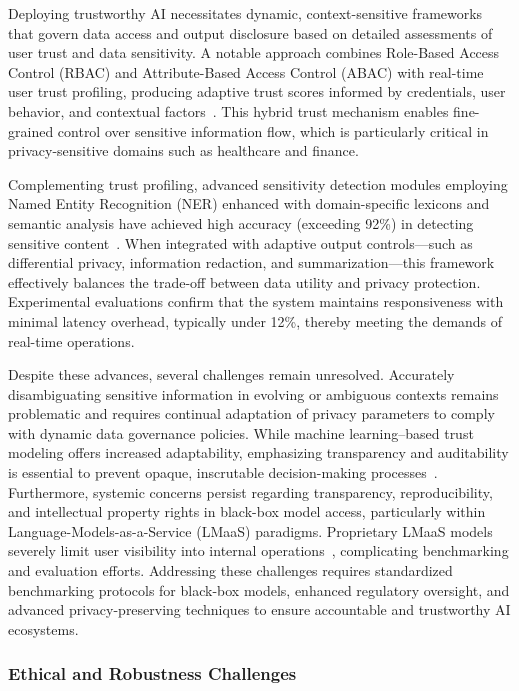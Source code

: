 \documentclass[sigconf]{acmart}
\begin{document}
Deploying trustworthy AI necessitates dynamic, context-sensitive frameworks that govern data access and output disclosure based on detailed assessments of user trust and data sensitivity. A notable approach combines Role-Based Access Control (RBAC) and Attribute-Based Access Control (ABAC) with real-time user trust profiling, producing adaptive trust scores informed by credentials, user behavior, and contextual factors~\cite{ref11}. This hybrid trust mechanism enables fine-grained control over sensitive information flow, which is particularly critical in privacy-sensitive domains such as healthcare and finance.

Complementing trust profiling, advanced sensitivity detection modules employing Named Entity Recognition (NER) enhanced with domain-specific lexicons and semantic analysis have achieved high accuracy (exceeding 92\%) in detecting sensitive content~\cite{ref11}. When integrated with adaptive output controls—such as differential privacy, information redaction, and summarization—this framework effectively balances the trade-off between data utility and privacy protection. Experimental evaluations confirm that the system maintains responsiveness with minimal latency overhead, typically under 12\%, thereby meeting the demands of real-time operations.

Despite these advances, several challenges remain unresolved. Accurately disambiguating sensitive information in evolving or ambiguous contexts remains problematic and requires continual adaptation of privacy parameters to comply with dynamic data governance policies. While machine learning–based trust modeling offers increased adaptability, emphasizing transparency and auditability is essential to prevent opaque, inscrutable decision-making processes~\cite{ref11}. Furthermore, systemic concerns persist regarding transparency, reproducibility, and intellectual property rights in black-box model access, particularly within Language-Models-as-a-Service (LMaaS) paradigms. Proprietary LMaaS models severely limit user visibility into internal operations~\cite{ref8}, complicating benchmarking and evaluation efforts. Addressing these challenges requires standardized benchmarking protocols for black-box models, enhanced regulatory oversight, and advanced privacy-preserving techniques to ensure accountable and trustworthy AI ecosystems.

\subsubsection{Ethical and Robustness Challenges}
\end{document}
